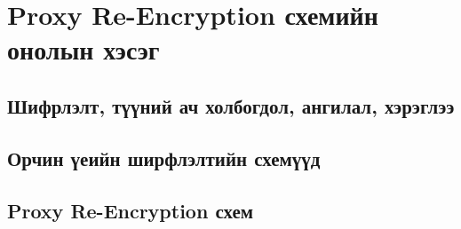 
\chapter{Proxy Re-Encryption схемийн онолын хэсэг} %
\label{Chapter1} %
\pagecolor{white}

\newcommand{\keyword}[1]{\textbf{#1}}
\newcommand{\tabhead}[1]{\textbf{#1}}
\newcommand{\code}[1]{\texttt{#1}}
\newcommand{\file}[1]{\texttt{\bfseries#1}}
\newcommand{\option}[1]{\texttt{\itshape#1}}

\section{Шифрлэлт, түүний ач холбогдол, ангилал, хэрэглээ}

\section{Орчин үеийн ширфлэлтийн схемүүд}

\section{Proxy Re-Encryption схем}
